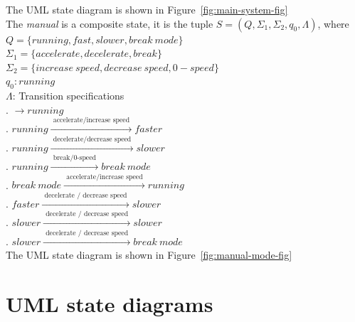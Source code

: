 \documentclass[12pt]{article}
\begin{document}
\begin{spacing}{1.5}
\noindent The UML state diagram is shown in Figure~\ref{fig:main-system-fig}\\


\noindent The \textit{manual} is a composite state, it is the tuple $S = (Q, \Sigma_1, \Sigma_2, q_0, \Lambda)$, where\\

\noindent $Q = \{running, fast, slower, break~mode\}$\\
\noindent $\Sigma_1 = \{accelerate, decelerate, break\}$\\
\noindent $\Sigma_2 = \{increase~speed, decrease~speed, 0-speed\}$\\
\noindent $q_0: running$\\
\noindent $\Lambda$: Transition specifications\\
. $\rightarrow running$\\
. $running \xrightarrow {\text { accelerate/increase speed }} faster$\\
. $running \xrightarrow {\text { decelerate/decrease speed }} slower$\\
. $running \xrightarrow {\text { break/0-speed }} break~mode$\\
. $break~mode \xrightarrow {\text { accelerate/increase speed }} running$\\
. $faster \xrightarrow {\text { decelerate / decrease speed }} slower$\\
. $slower \xrightarrow {\text { decelerate / decrease speed }} slower$\\
. $slower \xrightarrow {\text { decelerate / decrease speed }} break~mode$\\

\noindent The UML state diagram is shown in Figure~\ref{fig:manual-mode-fig}\\


\newpage

\section{UML state diagrams}


\end{spacing}
\end{document}
